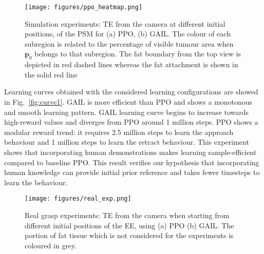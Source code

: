 \documentclass[letterpaper, 10 pt, conference]{ieeeconf}
\begin{document}
\begin{figure}[thpb]
	\centering
	\texttt{[image: figures/ppo\_heatmap.png]}
	\caption{Simulation experiments: TE from the camera at different initial positions, of the PSM for (a) PPO, (b) GAIL. The colour of each subregion is related to the percentage of visible tumour area when $\textbf{p}_0$ belongs to that subregion. The fat boundary from the top view is depicted in red dashed lines whereas the fat attachment is shown in the solid red line} 
	\label{fig:heat_simulation}
\end{figure}
 
Learning curves obtained with the considered learning configurations are showed in Fig.~\ref{fig:curve1}.
GAIL is more efficient than PPO and shows a monotonous and smooth learning pattern. 
GAIL learning curve begins to increase towards high-reward values and diverges from PPO around 1 million steps. PPO shows a modular reward trend: it requires 2.5 million steps to learn the approach behaviour and 1 million steps to learn the retract behaviour.
This experiment shows that incorporating human demonstrations makes learning sample-efficient compared to baseline PPO. This result verifies our hypothesis that incorporating human knowledge can provide initial prior reference and takes fewer timesteps to learn the behaviour.

\begin{figure}[thpb]
	\centering
	\texttt{[image: figures/real\_exp.png]}
	\caption{Real grasp experiments: TE from the camera when starting from different initial positions of the EE, using (a) PPO (b) GAIL. The portion of fat tissue which is not considered for the experiments is coloured in grey.} 
	\label{fig:heat_real}
\end{figure}
\end{document}
